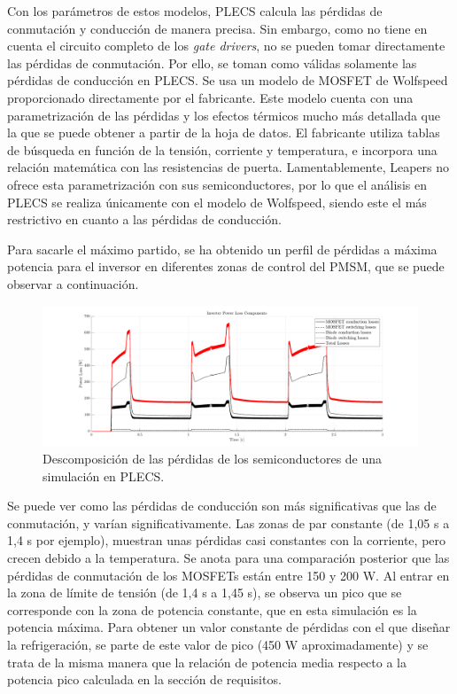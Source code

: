 Con los parámetros de estos modelos, PLECS calcula las pérdidas de conmutación y conducción de manera precisa. Sin embargo, como no tiene en cuenta el circuito completo de los \textit{gate drivers}, no se pueden tomar directamente las pérdidas de conmutación. Por ello, se toman como válidas solamente las pérdidas de conducción en PLECS. Se usa un modelo de MOSFET de Wolfspeed proporcionado directamente por el fabricante. Este modelo cuenta con una parametrización de las pérdidas y los efectos térmicos mucho más detallada que la que se puede obtener a partir de la hoja de datos. El fabricante utiliza tablas de búsqueda en función de la tensión, corriente y temperatura, e incorpora una relación matemática con las resistencias de puerta. Lamentablemente, Leapers no ofrece esta parametrización con sus semiconductores, por lo que el análisis en PLECS se realiza únicamente con el modelo de Wolfspeed, siendo este el más restrictivo en cuanto a las pérdidas de conducción.

Para sacarle el máximo partido, se ha obtenido un perfil de pérdidas a máxima potencia para el inversor en diferentes zonas de control del PMSM, que se puede observar a continuación.

\begin{figure}[H]
	\centering
	\includegraphics[width=0.9\linewidth]{fig/PLECS-invLosses}
	\caption{Descomposición de las pérdidas de los semiconductores de una simulación en PLECS.}
\end{figure}

Se puede ver como las pérdidas de conducción son más significativas que las de conmutación, y varían significativamente. Las zonas de par constante (de 1,05 s a 1,4 s por ejemplo), muestran unas pérdidas casi constantes con la corriente, pero crecen debido a la temperatura. Se anota para una comparación posterior que las pérdidas de conmutación de los MOSFETs están entre 150 y 200 W. Al entrar en la zona de límite de tensión (de 1,4 s a 1,45 s), se observa un pico que se corresponde con la zona de potencia constante, que en esta simulación es la potencia máxima. Para obtener un valor constante de pérdidas con el que diseñar la refrigeración, se parte de este valor de pico (450 W aproximadamente) y se trata de la misma manera que la relación de potencia media respecto a la potencia pico calculada en la sección de requisitos.

